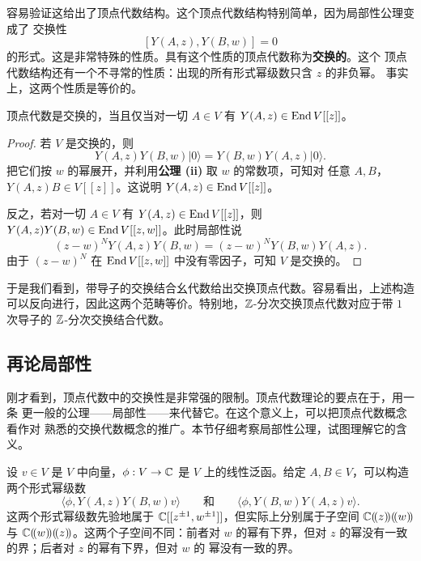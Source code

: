容易验证这给出了顶点代数结构。这个顶点代数结构特别简单，因为局部性公理变成了
交换性
\[
    [Y(A,z),Y(B,w)]=0
\]
的形式。这是非常特殊的性质。具有这个性质的顶点代数称为\textbf{交换的}。这个
顶点代数结构还有一个不寻常的性质：出现的所有形式幂级数只含 $z$ 的非负幂。
事实上，这两个性质是等价的。

\renewcommand{\thelemma}{2.2.1}
\begin{lemma}
    顶点代数是交换的，当且仅当对一切 $A\in V$ 有
    $Y(A,z)\in\operatorname{End} V[[z]]$。
\end{lemma}

\begin{proof}
    若 $V$ 是交换的，则
    \[
        Y(A,z)Y(B,w)|0\rangle=Y(B,w)Y(A,z)|0\rangle.
    \]
    把它们按 $w$ 的幂展开，并利用\textbf{公理 (ii)} 取 $w$ 的常数项，可知对
    任意 $A,B$，$Y(A,z)B\in V[[z]]$。这说明 $Y(A,z)\in\operatorname{End} V[[z]]$。

    反之，若对一切 $A\in V$ 有 $Y(A,z)\in\operatorname{End} V[[z]]$，则
    $Y(A,z)Y(B,w)\in\operatorname{End} V[[z,w]]$。此时局部性说
    \[
        (z-w)^NY(A,z)Y(B,w)=(z-w)^NY(B,w)Y(A,z).
    \]
    由于 $(z-w)^N$ 在 $\operatorname{End} V[[z,w]]$ 中没有零因子，可知 $V$ 是交换的。
\end{proof}

于是我们看到，带导子的交换结合幺代数给出交换顶点代数。容易看出，上述构造
可以反向进行，因此这两个范畴等价。特别地，$\mathbb{Z}$-分次交换顶点代数对应于带
$1$ 次导子的 $\mathbb{Z}$-分次交换结合代数。

\subsection{再论局部性}

刚才看到，顶点代数中的交换性是非常强的限制。顶点代数理论的要点在于，用一条
更一般的公理——局部性——来代替它。在这个意义上，可以把顶点代数概念看作对
熟悉的交换代数概念的推广。本节仔细考察局部性公理，试图理解它的含义。

设 $v\in V$ 是 $V$ 中向量，$\phi:V\to\mathbb{C}$ 是 $V$ 上的线性泛函。给定
$A,B\in V$，可以构造两个形式幂级数
\[
    \langle\phi,Y(A,z)Y(B,w)v\rangle
    \qquad\text{和}\qquad
    \langle\phi,Y(B,w)Y(A,z)v\rangle.
\]
这两个形式幂级数先验地属于 $\mathbb{C}[[z^{\pm1},w^{\pm1}]]$，但实际上分别属于子空间
$\mathbb{C}(\!(z)\!)(\!(w)\!)$ 与 $\mathbb{C}(\!(w)\!)(\!(z)\!)$。这两个子空间不同：前者对
$w$ 的幂有下界，但对 $z$ 的幂没有一致的界；后者对 $z$ 的幂有下界，但对 $w$ 的
幂没有一致的界。

